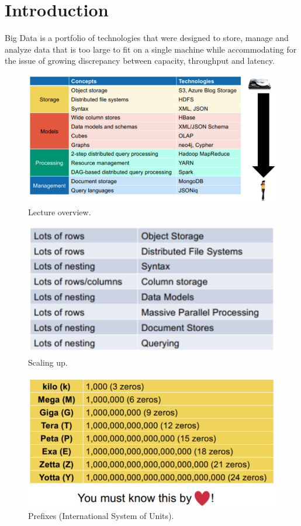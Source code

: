 \section{Introduction}

Big Data is a portfolio of technologies that were designed to store, manage and analyze data that is too large to fit on a single machine while accommodating for the issue of growing discrepancy between capacity, throughput and latency.

\begin{figure}[h]
	\centering
	\includegraphics[scale=0.8]{images/1-overview.PNG}
	\caption{Lecture overview.}
	\label{fig:overview}
\end{figure}

\begin{figure}[h]
	\centering
	\includegraphics[scale=0.7]{images/1-scale.PNG}
	\caption{Scaling up.}
	\label{fig:scale}
\end{figure}

\begin{figure}[h]
	\centering
	\includegraphics[scale=0.5]{images/1-prefixes.PNG}
	\caption{Prefixes (International System of Units).}
	\label{fig:prefix}
\end{figure}

